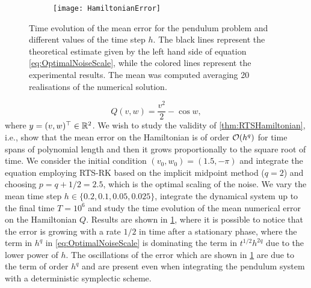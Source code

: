 \documentclass[final,onefignum,onetabnum]{siamonline171218}
\begin{document}
\begin{figure}[t]
	\begin{center}
	\begin{subfigure}{0.7\linewidth}
	\texttt{[image: HamiltonianError]} 
	\end{subfigure}
	\begin{subfigure}{0.14\linewidth}
	\end{subfigure}
	\end{center}

	\caption{Time evolution of the mean error for the pendulum problem and different values of the time step $h$. The black lines represent the theoretical estimate given by the left hand side of equation \eqref{eq:OptimalNoiseScale}, while the colored lines represent the experimental results. The mean was computed averaging 20 realisations of the numerical solution.}
	\label{fig:MeanTime}	
\end{figure}
\begin{equation}
Q(v, w) = \frac{v^2}{2} - \cos w,
\end{equation}
where $y = (v, w)^\top \in \mathbb{R}^2$. We wish to study the validity of \cref{thm:RTSHamiltonian}, i.e., show that the mean error on the Hamiltonian is of order $\mathcal{O}(h^q)$ for time spans of polynomial length and then it grows proportionally to the square root of time. We consider the initial condition $(v_0, w_0) = (1.5, -\pi)$ and integrate the equation employing RTS-RK based on the implicit midpoint method ($q = 2$) and choosing $p = q + 1/2 = 2.5$, which is the optimal scaling of the noise. We vary the mean time step $h \in \{0.2, 0.1, 0.05, 0.025\}$, integrate the dynamical system up to the final time $T = 10^6$ and study the time evolution of the mean numerical error on the Hamiltonian $Q$. Results are shown in \cref{fig:MeanTime}, where it is possible to notice that the error is growing with a rate $1/2$ in time after a stationary phase, where the term in $h^q$ in \eqref{eq:OptimalNoiseScale} is dominating the term in $t^{1/2}h^{2q}$ due to the lower power of $h$. The oscillations of the error which are shown in \cref{fig:MeanTime} are due to the term of order $h^q$ and are present even when integrating the pendulum system with a deterministic symplectic scheme. 
\end{document}
